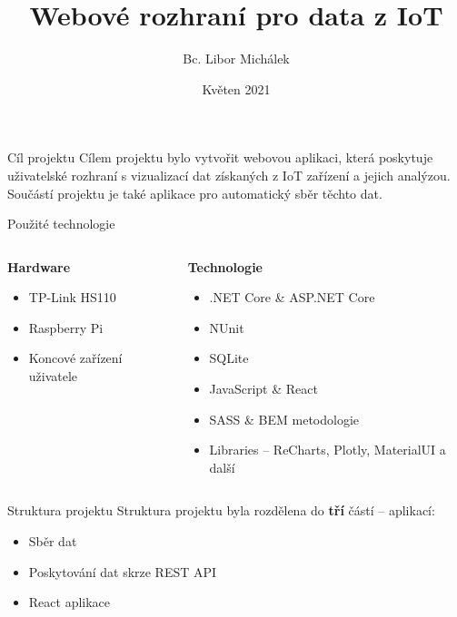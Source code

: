 \documentclass{beamer}
\title{Webové rozhraní pro data z IoT}
\author{Bc. Libor Michálek}
\date{Květen 2021}
\institute{VŠB – Technická Univerzita Ostrava}
\newcommand\myheading[1]{%
	\par\bigskip
	{\Large\bfseries#1}\par\smallskip}
\begin{document}
\begin{frame}
	\centering
    \maketitle
\end{frame}


\begin{frame}{Cíl projektu}
	\centering
	Cílem projektu bylo vytvořit webovou aplikaci, která poskytuje uživatelské rozhraní s vizualizací dat získaných z IoT zařízení a jejich analýzou. Součástí projektu je také aplikace pro automatický sběr těchto dat.
\end{frame}

\begin{frame}[t]{Použité technologie}
	\begin{columns}[t]
		\begin{column}{0.5\textwidth}
			\myheading{Hardware}
			\begin{itemize}
				\item TP-Link HS110
				\item Raspberry Pi
				\item Koncové zařízení uživatele
			\end{itemize}
		\end{column}
		\pause
		\begin{column}{0.5\textwidth}
			\myheading{Technologie}
			\begin{itemize}
				\item .NET Core \& ASP.NET Core
				\item NUnit 
				\item SQLite
				\item JavaScript \& React
				\item SASS \& BEM metodologie
				\item Libraries – ReCharts, Plotly, MaterialUI a další
			\end{itemize}
		\end{column}
	\end{columns}
\end{frame}

\begin{frame}{Struktura projektu}
	Struktura projektu byla rozdělena do \textbf{tří} částí – aplikací:
	\bigbreak
	\begin{itemize}
		\item Sběr dat
		\item Poskytování dat skrze REST API
		\item React aplikace
	\end{itemize}
\end{frame}
\end{document}
